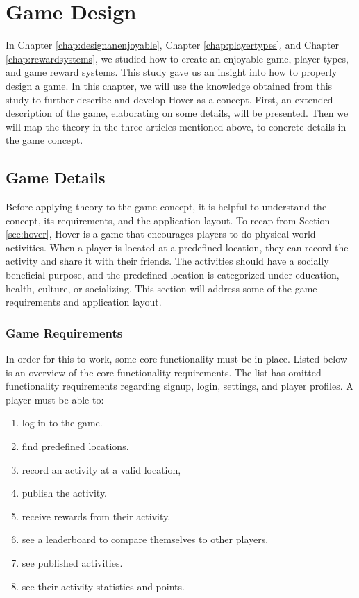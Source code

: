 \documentclass[../Main.tex]{subfiles}
\begin{document}
\section{Game Design}
\label{chap:game_design}

In Chapter \ref{chap:designanenjoyable}, Chapter \ref{chap:playertypes}, and Chapter \ref{chap:rewardsystems}, we studied how to create an enjoyable game, player types, and game reward systems. This study gave us an insight into how to properly design a game. In this chapter, we will use the knowledge obtained from this study to further describe and develop Hover as a concept. First, an extended description of the game, elaborating on some details, will be presented. Then we will map the theory in the three articles mentioned above, to concrete details in the game concept.

\subsection{Game Details}
Before applying theory to the game concept, it is helpful to understand the concept, its requirements, and the application layout. To recap from Section \ref{sec:hover}, Hover is a game that encourages players to do physical-world activities. When a player is located at a predefined location, they can record the activity and share it with their friends. The activities should have a socially beneficial purpose, and the predefined location is categorized under education, health, culture, or socializing. This section will address some of the game requirements and application layout.

\subsubsection{Game Requirements}
In order for this to work, some core functionality must be in place. Listed below is an overview of the core functionality requirements. The list has omitted functionality requirements regarding signup, login, settings, and player profiles. A player must be able to: 

\begin{enumerate}
    \item log in to the game.
    \item find predefined locations.
    \item record an activity at a valid location, 
    \item publish the activity. 
    \item receive rewards from their activity.
    \item see a leaderboard to compare themselves to other players.
    \item see published activities. 
    \item see their activity statistics and points.
\end{enumerate}
\end{document}
